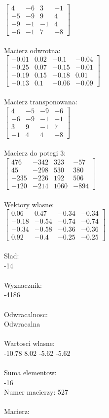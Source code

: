 \documentclass[a4paper,12pt]{article}
\begin{document}
$\begin{bmatrix} 4&-6&3&-1\\-5&-9&9&4\\-9&-1&-1&4\\-6&-1&7&-8 \end{bmatrix}$
\\
\\
Macierz odwrotna:\\

$\begin{bmatrix} -0.01&0.02&-0.1&-0.04\\-0.25&0.07&-0.15&-0.01\\-0.19&0.15&-0.18&0.01\\-0.13&0.1&-0.06&-0.09 \end{bmatrix}$
\\
\\
Macierz transponowana:\\

$\begin{bmatrix} 4&-5&-9&-6\\-6&-9&-1&-1\\3&9&-1&7\\-1&4&4&-8 \end{bmatrix}$
\\
\\
Macierz do potegi 3:\\

$\begin{bmatrix} 476&-342&323&-57\\45&-298&530&380\\-235&-226&192&506\\-120&-214&1060&-894 \end{bmatrix}$
\\
\\
Wektory wlasne:\\

$\begin{bmatrix} 0.06&0.47&-0.34&-0.34\\-0.18&-0.54&-0.74&-0.74\\-0.34&-0.58&-0.36&-0.36\\0.92&-0.4&-0.25&-0.25 \end{bmatrix}$
\\
\\
Slad:\\
-14
\\
\\
Wyznacznik:\\
-4186
\\
\\
Odwracalnosc:\\
Odwracalna
\\
\\
Wartosci wlasne:\\
-10.78 8.02 -5.62 -5.62
\\
\\
Suma elementow:\\
-16
\\
\newpage
Numer macierzy:
527
\\
\\
Macierz:\\
\end{document}

